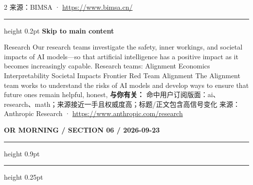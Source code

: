 \documentclass[10.5pt]{ctexart}
\begin{document}
\begin{multicols}{2}
{\footnotesize\color{ormuted} 来源：BIMSA · \url{https://www.bimsa.cn/}}
\vspace{2mm}
\hrule height 0.2pt
\vspace{2mm}
{\large\bfseries Skip to main content}\par
Research Our research teams investigate the safety, inner workings, and societal impacts of AI models—so that artificial intelligence has a positive impact as it becomes increasingly capable. Research teams: Alignment Economics Interpretability Societal Impacts Frontier Red Team Alignment The Alignment team works to understand the risks of AI models and develop ways to ensure that future ones remain helpful, honest, 
\textbf{与你有关：} 命中用户订阅版面：ai、research、math；来源接近一手且权威度高；标题/正文包含高信号变化
{\footnotesize\color{ormuted} 来源：Anthropic Research · \url{https://www.anthropic.com/research}}
\end{multicols}
\newpage
{\small\bfseries OR MORNING / SECTION 06 / 2026-09-23}
\vspace{2mm}
\hrule height 0.9pt
\vspace{1.5mm}
\hrule height 0.25pt
\vspace{4mm}
\end{document}
